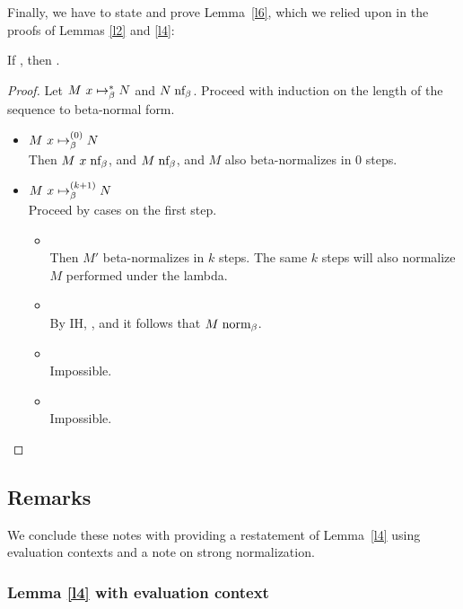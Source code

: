 \documentclass{article}
\begin{document}
Finally, we have to state and prove Lemma~\ref{l6}, which we relied upon in the proofs of
Lemmas \ref{l2} and \ref{l4}:

\begin{lemma}\label{l6}
If , then .
\end{lemma}

\begin{proof}
Let $M\ x \mapsto_{\beta}^* N$ and $N \mathrel{\text{nf}_\beta}$.
Proceed with induction on the length of the sequence to beta-normal form.
\begin{itemize}
  \setlength\itemsep{1em}
  \item $M\ x \mapsto_{\beta}^{(0)} N$\\
  Then $M\ x \mathrel{\text{nf}_\beta}$, and $M \mathrel{\text{nf}_\beta}$, and $M$ also beta-normalizes in 0 steps.
  \item $M\ x \mapsto_{\beta}^{(k+1)} N$\\
  Proceed by cases on the first step.
  \begin{itemize}
  \setlength\itemsep{1em}
  \item {}\\
  Then $M'$ beta-normalizes in $k$ steps. The same $k$ steps will also normalize $M$ performed under the lambda.
  \item {}\\
  By IH, , and it follows that $M \mathrel{\text{norm}_\beta}$.
  \item {}\\
  Impossible.
  \item {}\\
  Impossible.
  \end{itemize}

\end{itemize}
\end{proof}

\subsection{Remarks}

We conclude these notes with providing a restatement of Lemma~\ref{l4} using evaluation
contexts and a note on strong normalization.

\subsubsection{Lemma \ref{l4} with evaluation context}
\end{document}
